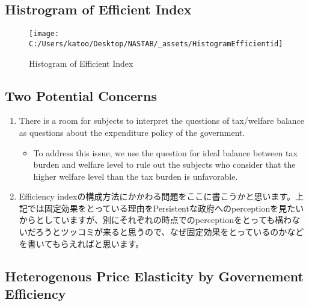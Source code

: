 \documentclass[ review  , 3p ]{elsarticle}
\providecommand{\tightlist}{%
  \setlength{\itemsep}{0pt}\setlength{\parskip}{0pt}}
\begin{document}
  \hypertarget{histrogram-of-efficient-index}{%
  \subsection{Histrogram of Efficient Index}\label{histrogram-of-efficient-index}}

  \begin{figure}

  {\centering \texttt{[image: C:/Users/katoo/Desktop/NASTAB/\_assets/HistogramEfficientid]} 

  }

  \caption{Histogram of Efficient Index}\label{fig:unnamed-chunk-1}
  \end{figure}

  \hypertarget{two-potential-concerns}{%
  \subsection{Two Potential Concerns}\label{two-potential-concerns}}

  \begin{enumerate}
  \def\labelenumi{\arabic{enumi}.}
  \tightlist
  \item
    There is a room for subjects to interpret the questions of tax/welfare balance as questions about the expenditure policy of the government.

    \begin{itemize}
    \tightlist
    \item
      To address this issue, we use the question for ideal balance between tax burden and welfare level to rule out the subjects who consider that the higher welfare level than the tax burden is unfavorable.
    \end{itemize}
  \item
    Efficiency indexの構成方法にかかわる問題をここに書こうかと思います。上記では固定効果をとっている理由をPersistentな政府へのperceptionを見たいからとしていますが、別にそれぞれの時点でのperceptionをとっても構わないだろうとツッコミが来ると思うので、なぜ固定効果をとっているのかなどを書いてもらえればと思います。
  \end{enumerate}

  \hypertarget{heterogenous-price-elasticity-by-governement-efficiency}{%
  \subsection{Heterogenous Price Elasticity by Governement Efficiency}\label{heterogenous-price-elasticity-by-governement-efficiency}}
\end{document}

